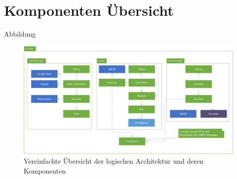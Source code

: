\section{Komponenten Übersicht}

Abbildung 

\begin{figure}[h]
	\includegraphics[width=1.0\textwidth]{images/logical-architecture-overview.png}
	\caption{Vereinfachte Übersicht der logischen Architektur und deren Komponenten }
	\label{fig:logical-architecture-overview}
\end{figure}

